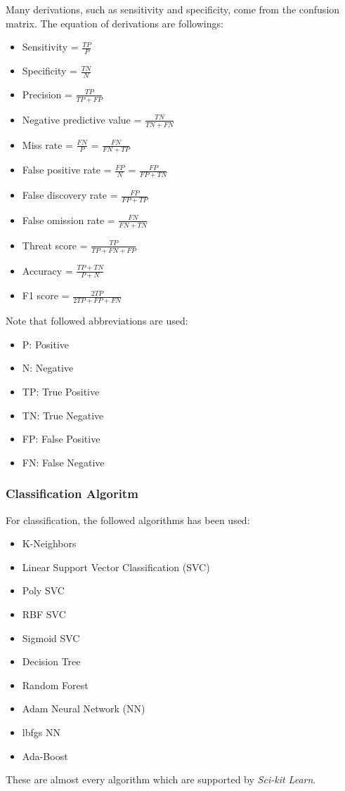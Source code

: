 \documentclass[aps, 11pt, a4paper]{article}
\begin{document}
					Many derivations, such as sensitivity and specificity, come from the confusion matrix. The equation of derivations are followings:
					\begin{itemize}
						\item Sensitivity = $\frac{TP}{P}$
						\item Specificity = $\frac{TN}{N}$
						\item Precision = $\frac{TP}{TP + FP}$
						\item Negative predictive value = $\frac{TN}{TN + FN}$
						\item Miss rate = $\frac{FN}{P}$ = $\frac{FN}{FN + TP}$
						\item False positive rate = $\frac{FP}{N}$ = $\frac{FP}{FP + TN}$
						\item False discovery rate = $\frac{FP}{FP + TP}$
						\item False omission rate = $\frac{FN}{FN + TN}$
						\item Threat score = $\frac{TP}{TP + FN + FP}$
						\item Accuracy = $\frac{TP+TN}{P + N}$
						\item F1 score = $\frac{2TP}{2TP + FP + FN}$
					\end{itemize}
					
					Note that followed abbreviations are used:
					\begin{itemize}
						\item P: Positive
						\item N: Negative
						\item TP: True Positive
						\item TN: True Negative
						\item FP: False Positive
						\item FN: False Negative
					\end{itemize}
				
			\subsubsection{Classification Algoritm}
				For classification, the followed algorithms has been used:
				\begin{itemize}
					\item K-Neighbors
					\item Linear Support Vector Classification (SVC)
					\item Poly SVC
					\item RBF SVC
					\item Sigmoid SVC
					\item Decision Tree
					\item Random Forest
					\item Adam Neural Network (NN)
					\item lbfgs NN
					\item Ada-Boost
				\end{itemize}
				These are almost every algorithm which are supported by \textit{Sci-kit Learn}.
    
\end{document}
